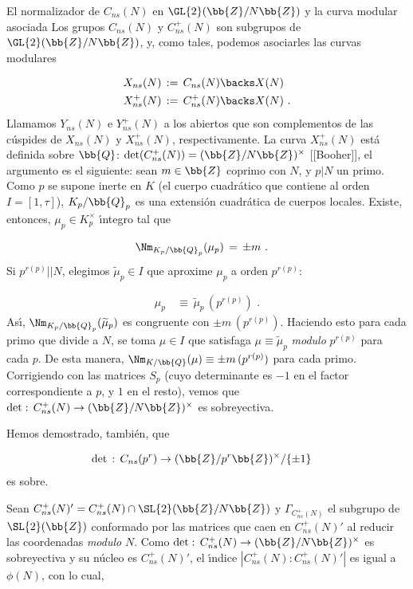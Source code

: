 \begin{subsection}{El normalizador de $C_{ns}(N)$ en $\GL{2}(\bb{Z}/N\bb{Z})$%
			y la curva modular asociada}
Los grupos $C_{ns}(N)$ y $C_{ns}^{+}(N)$ son subgrupos de $\GL{2}(\bb{Z}/N\bb{Z})$,
y, como tales, podemos asociarles las curvas modulares

\begin{align*}
 X_{ns}(N) & \,:=\,C_{ns}(N)\backs X(N)\\
 X_{ns}^{+}(N) &\,:=\,C_{ns}^{+}(N)\backs X(N)\text{ .}
\end{align*}
Llamamos $Y_{ns}(N)$ e $Y_{ns}^{+}(N)$ a los abiertos que son complementos de las
c\'{u}spides de $X_{ns}(N)$ y $X_{ns}^{+}(N)$, respectivamente. La curva
$X_{ns}^{+}(N)$ est\'{a} definida sobre $\bb{Q}$:
$\det(C_{ns}^{+}(N))=(\bb{Z}/N\bb{Z})^{\times}$ [[Booher]], el argumento es el
siguiente: sean $m\in\bb{Z}$ coprimo con $N$, y $p|N$ un primo. Como $p$ se
supone inerte en $K$ (el cuerpo cuadr\'{a}tico que contiene al orden
$I=[1,\tau]$), $K_{p}/\bb{Q}_{p}$ es una extensi\'{o}n cuadr\'{a}tica de cuerpos
locales. Existe, entonces, $\mu_{p}\in K_{p}^{\times}$ \'{\i}ntegro tal que

\begin{align*}
 \Nm_{K_{p}/\bb{Q}_{p}}(\mu_{p})& \,=\,\pm m\text{ .}
\end{align*}
Si $p^{r(p)}||N$, elegimos $\widetilde{\mu}_{p}\in I$ que aproxime $\mu_{p}$ a
orden $p^{r(p)}$:

\begin{align*}
 \mu_{p} & \,\equiv\,\widetilde{\mu}_{p}\,(p^{r(p)})\text{ .}
\end{align*}
As\'{\i}, $\Nm_{K_{p}/\bb{Q}_{p}}(\widetilde{\mu}_{p})$ es congruente con
$\pm m\,(p^{r(p)})$. Haciendo esto para cada primo que divide a $N$, se toma
$\mu\in I$ que satisfaga $\mu\equiv\widetilde{\mu}_{p}$ \textit{modulo} $p^{r(p)}$
para cada $p$. De esta manera, $\Nm_{K/\bb{Q}}(\mu)\equiv \pm m\,(p^{r(p)})$ para
cada primo. Corrigiendo con las matrices $S_{p}$ (cuyo determinante es $-1$ en el
factor correspondiente a $p$, y $1$ en el resto), vemos que
$\det:\,C_{ns}^{+}(N)\rightarrow(\bb{Z}/N\bb{Z})^{\times}$ es sobreyectiva.

\begin{obsDetSobreUnidades}
 Hemos demostrado, tambi\'{e}n, que

 \begin{align*}
  \det & \,:\,C_{ns}(p^{r})\rightarrow(\bb{Z}/p^{r}\bb{Z})^{\times}/\{\pm 1\}
 \end{align*}
es sobre.

\end{obsDetSobreUnidades}

Sean $C_{ns}^{+}(N)'=C_{ns}^{+}(N)\cap\SL{2}(\bb{Z}/N\bb{Z})$ y
$\Gamma_{C_{ns}^{+}(N)}$ el subgrupo de $\SL{2}(\bb{Z})$ conformado por las
matrices que caen en $C_{ns}^{+}(N)'$ al reducir las coordenadas \textit{modulo}
$N$. Como $\det:\,C_{ns}^{+}(N)\rightarrow(\bb{Z}/N\bb{Z})^{\times}$ es
sobreyectiva y su n\'{u}cleo es $C_{ns}^{+}(N)'$, el \'{\i}ndice
$|C_{ns}^{+}(N):C_{ns}^{+}(N)'|$ es igual a $\phi(N)$, con lo cual, 


\end{subsection}

